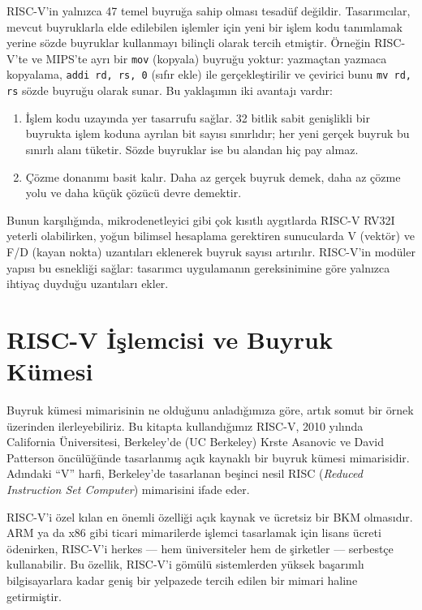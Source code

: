 RISC-V'in yalnızca 47 temel buyruğa sahip olması tesadüf değildir. Tasarımcılar, mevcut buyruklarla elde edilebilen işlemler için yeni bir işlem kodu tanımlamak yerine sözde buyruklar kullanmayı bilinçli olarak tercih etmiştir. Örneğin RISC-V'te ve MIPS'te ayrı bir \texttt{mov} (kopyala) buyruğu yoktur: yazmaçtan yazmaca kopyalama, \texttt{addi rd, rs, 0} (sıfır ekle) ile gerçekleştirilir ve çevirici bunu \texttt{mv rd, rs} sözde buyruğu olarak sunar. Bu yaklaşımın iki avantajı vardır:

\begin{enumerate}[nosep]
\item İşlem kodu uzayında yer tasarrufu sağlar. 32 bitlik sabit genişlikli bir buyrukta işlem koduna ayrılan bit sayısı sınırlıdır; her yeni gerçek buyruk bu sınırlı alanı tüketir. Sözde buyruklar ise bu alandan hiç pay almaz.
\item Çözme donanımı basit kalır. Daha az gerçek buyruk demek, daha az çözme yolu ve daha küçük çözücü devre demektir.
\end{enumerate}

Bunun karşılığında, mikrodenetleyici gibi çok kısıtlı aygıtlarda RISC-V RV32I yeterli olabilirken, yoğun bilimsel hesaplama gerektiren sunucularda V (vektör) ve F/D (kayan nokta) uzantıları eklenerek buyruk sayısı artırılır. RISC-V'in modüler yapısı bu esnekliği sağlar: tasarımcı uygulamanın gereksinimine göre yalnızca ihtiyaç duyduğu uzantıları ekler.

\section{RISC-V İşlemcisi ve Buyruk Kümesi}
\label{sec:riscv-islemcisi}

Buyruk kümesi mimarisinin ne olduğunu anladığımıza göre, artık somut bir örnek üzerinden ilerleyebiliriz. Bu kitapta kullandığımız RISC-V, 2010 yılında California Üniversitesi, Berkeley'de (UC Berkeley) Krste Asanovic ve David Patterson öncülüğünde tasarlanmış açık kaynaklı bir buyruk kümesi mimarisidir. Adındaki ``V'' harfi, Berkeley'de tasarlanan beşinci nesil RISC (\textit{Reduced Instruction Set Computer}) mimarisini ifade eder.

RISC-V'i özel kılan en önemli özelliği açık kaynak ve ücretsiz bir BKM olmasıdır. ARM ya da x86 gibi ticari mimarilerde işlemci tasarlamak için lisans ücreti ödenirken, RISC-V'i herkes --- hem üniversiteler hem de şirketler --- serbestçe kullanabilir. Bu özellik, RISC-V'i gömülü sistemlerden yüksek başarımlı bilgisayarlara kadar geniş bir yelpazede tercih edilen bir mimari haline getirmiştir.

